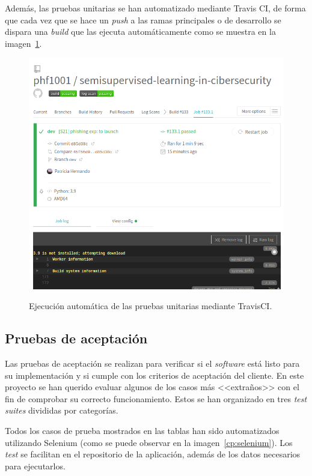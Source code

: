 Además, las pruebas unitarias se han automatizado mediante Travis CI, de forma que cada vez que se hace un \textit{push} a las ramas principales o de desarrollo se dispara una \textit{build} que las ejecuta automáticamente como se muestra en la imagen~\ref{d:cp-travis}.

\begin{figure}[h]
	\caption[TravisCI: ejecución automática de pruebas unitarias]{Ejecución automática de las pruebas unitarias mediante TravisCI.}
	\centering
	\includegraphics[width=\textwidth]{../img/anexos/cp/travis-tests}
	\label{d:cp-travis}
\end{figure}


\subsection{Pruebas de aceptación}
\label{s:pruebas-aceptación}

Las pruebas de aceptación se realizan para verificar si el \textit{software} está listo para su implementación y si cumple con los criterios de aceptación del cliente. En este proyecto se han querido evaluar algunos de los casos más <<extraños>> con el fin de comprobar su correcto funcionamiento. Estos se han organizado en tres \textit{test suites} divididas por categorías.

Todos los casos de prueba mostrados en las tablas han sido automatizados utilizando Selenium (como se puede observar en la imagen~\ref{cp:selenium}). Los \textit{test} se facilitan en el repositorio de la aplicación, además de los datos necesarios para ejecutarlos.

